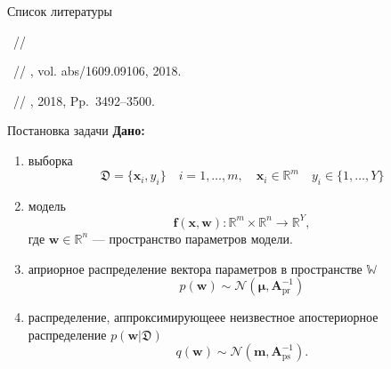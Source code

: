 \documentclass[9pt,pdf,hyperref={unicode}]{beamer}
\begin{document}
	\begin{frame}{Список литературы}
		\begin{thebibliography}{1}
			
			~//
			
			~//
			, vol. abs/1609.09106, 2018.
			
			~//
			, 2018, Pp.\, 3492--3500.
			
		\end{thebibliography}
		
	\end{frame}

\begin{frame}{Постановка задачи}
\textbf{Дано:} 
\begin{enumerate}
    \item выборка 
    $$\mathfrak{D} = \{ \mathbf{x}_i, y_i\} \quad i = 1,\dots, m, \quad \mathbf{x}_i \in \mathbb{R}^m \quad y_i \in \{1,\dots,Y\} $$
    \item модель
    $$\mathbf{f}(\mathbf{x},\mathbf{w}):\mathbb{R}^m \times \mathbb{R}^n \longrightarrow \mathbb{R}^Y,$$
     где $\mathbf{w} \in \mathbb{R}^n$ --- пространство параметров модели.
    \item априорное распределение вектора параметров в пространстве $\mathbb{W}$ 
    $$p(\mathbf{w}) \sim \mathcal{N} (\boldsymbol{\mu}, \mathbf{A}_{\text{pr}}^{-1})$$
    \item распределение, аппроксимирующеее неизвестное апостериорное распределение $p(\mathbf{w}| \mathfrak{D})$
    $$q(\mathbf{w}) \sim \mathcal{N} (\mathbf{m},\mathbf{A}_{\text{ps}}^{-1}).$$
\end{enumerate}




\end{frame}
\end{document}
